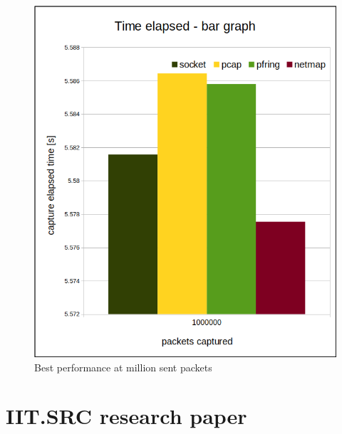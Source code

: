 \documentclass[12pt,a4paper,twoside]{report}
\begin{document}
\begin{appendices}
\begin{figure}[h]
			\includegraphics[scale=0.5]{speed_bar-graph}
			\caption{Best performance at million sent packets}
			\label{figure:tests:timed:best}
		\end{figure}
	\chapter{IIT.SRC research paper} \label{appendix:iitsrc:paper}
		

\end{appendices}
\end{document}
